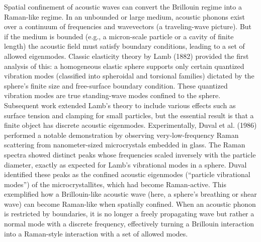 Spatial confinement of acoustic waves can convert the Brillouin regime into a Raman-like regime. In an unbounded or large medium, acoustic phonons exist over a continuum of frequencies and wavevectors (a traveling-wave picture). But if the medium is bounded (e.g., a micron-scale particle or a cavity of finite length) the acoustic field must satisfy boundary conditions, leading to a set of allowed eigenmodes. Classic elasticity theory by Lamb (1882) \cite{lamb1881vibrations} provided the first analysis of this: a homogeneous elastic sphere supports only certain quantized vibration modes (classified into spheroidal and torsional families) dictated by the sphere’s finite size and free-surface boundary condition. These quantized vibration modes are true standing-wave modes confined to the sphere. Subsequent work extended Lamb’s theory to include various effects such as surface tension and clamping for small particles, \cite{} but the essential result is that a finite object has discrete acoustic eigenmodes. Experimentally, Duval et al. (1986) \cite{duval1986vibration} performed a notable demonstration by observing very-low-frequency Raman scattering from nanometer-sized microcrystals embedded in glass. The Raman spectra showed distinct peaks whose frequencies scaled inversely with the particle diameter, exactly as expected for Lamb’s vibrational modes in a sphere. Duval identified these peaks as the confined acoustic eigenmodes (“particle vibrational modes”) of the microcrystallites, which had become Raman-active. This exemplified how a Brillouin-like acoustic wave (here, a sphere’s breathing or shear wave) can become Raman-like when spatially confined. When an acoustic phonon is restricted by boundaries, it is no longer a freely propagating wave but rather a normal mode with a discrete frequency, effectively turning a Brillouin interaction into a Raman-style interaction with a set of allowed modes.

